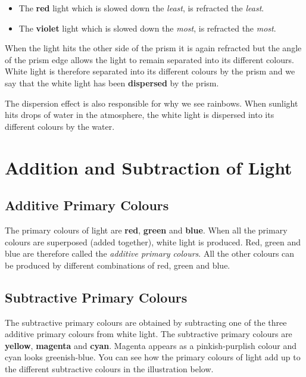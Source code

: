 \begin{itemize}
\item The \textbf{red} light which is slowed down the \textit{least}, is refracted the \textit{least}. 
\item The \textbf{violet} light which is slowed down the \textit{most}, is refracted the \textit{most}. 
\end{itemize}
When the light hits the other side of the prism it is again refracted but the angle of the prism edge allows the light to remain separated into its different colours.
White light is therefore separated into its different colours by the prism and we say that the white light has been \textbf{dispersed} by the prism.


The dispersion effect is also responsible for why we see rainbows. When sunlight hits drops of water in the atmosphere, the white light is dispersed into its different colours by the water.




\section{Addition and Subtraction of Light} 

\subsection{Additive Primary Colours}
The primary colours of light are \textbf{red}, \textbf{green} and \textbf{blue}. When all the primary colours are superposed (added together), white light is produced. Red, green and blue are therefore called the \textit{additive primary colours}. All the other colours can be produced by different combinations of red, green and blue. 

\subsection{Subtractive Primary Colours}
The subtractive primary colours are obtained by subtracting one of the three additive primary colours from white light. The subtractive primary colours are \textbf{yellow}, \textbf{magenta} and \textbf{cyan}. Magenta appears as a pinkish-purplish colour and cyan looks greenish-blue. You can see how the primary colours of light add up to the different subtractive colours in the illustration below.

